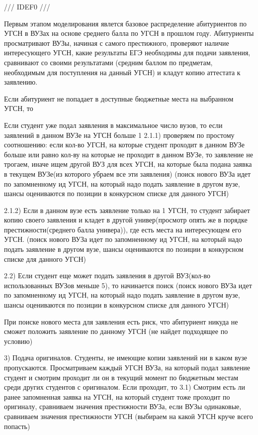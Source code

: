 /// IDEF0 ///

Первым этапом моделирования явлется базовое распределение абитуриентов по УГСН в ВУЗах на основе среднего балла по УГСН в прошлом году. Абитуриенты просматривают ВУЗы, начиная с самого престижного, проверяют наличие интересующего УГСН, какие результаты ЕГЭ необходимы для подачи заявления, сравнивают со своими результатами (средним баллом по предметам, необходимым для поступления на данный УГСН) и кладут копию аттестата к заявлению.

Если абитуриент не попадает в доступные бюджетные места на выбранном УГСН, то 

Если студент уже подал заявления в максимальное число вузов, то если заявлений в данном ВУЗе на УГСН больше 1
2.1.1) проверяем по простому соотношению: если кол-во УГСН, на которые студент проходит в данном ВУЗе больше или равно кол-ву на которые не проходит в данном ВУЗе, то заявление не трогаем, иначе ищем другой ВУЗ для всех УГСН, на которые была подана заявка в текущем ВУЗе(из которого убраем все эти заявления)
(поиск нового ВУЗа идет по запомненному ид УГСН, на который надо подать заявление в другом вузе, шансы оцениваются по позиции в конкурсном списке для данного УГСН)

2.1.2) Если в данном вузе есть заявление только на 1 УГСН, то студент забирает копию своего заявления и кладет в другой универ(просмотр опять же в порядке престижности(среднего балла универа)), где есть места на интересующем его УГСН.  
(поиск нового ВУЗа идет по запомненному ид УГСН, на который надо подать заявление в другом вузе, шансы оцениваются по позиции в конкурсном списке для данного УГСН)

2.2) Если студент еще может подать заявления в другой ВУЗ(кол-во использованных ВУЗов меньше 5), то начинается поиск (поиск нового ВУЗа идет по запомненному ид УГСН, на который надо подать заявление в другом вузе, шансы оцениваются по позиции в конкурсном списке для данного УГСН)

При поиске нового места для заявления есть риск, что абитуриент никуда не сможет положить заявление по данному УГСН (не найдет подходящее по условию)

3) Подача оригиналов. Студенты, не имеющие копии заявлений ни в каком вузе пропускаются. Просматриваем каждый УГСН ВУЗа, на который подал заявление студент и смотрим проходит ли он в текущий момент по бюджетным местам среди других студентов с оригиналом. Если проходит, то
3.1) Смотрим есть ли ранее запомненная заявка на УГСН, на который студент тоже проходит по оригиналу, сравниваем значения престижности ВУЗа, если ВУЗы одинаковые, сравниваем значения престижности УГСН (выбираем на какой УГСН круче всего попасть)

